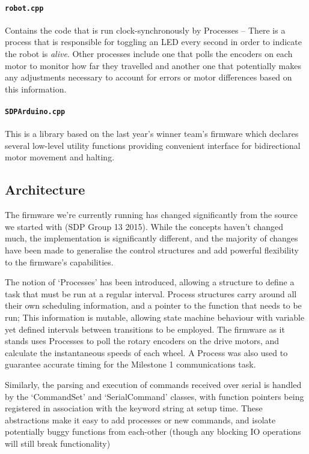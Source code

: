 \paragraph{\texttt{robot.cpp}} Contains the code that is run clock-synchronously by Processes -- There is a process that is responsible for toggling an LED every second in order to indicate the robot is \textit{alive}. Other processes include one that polls the encoders on each motor to monitor how far they travelled and another one that potentially makes any adjustments necessary to account for errors or motor differences based on this information.

\paragraph{\texttt{SDPArduino.cpp}} This is a library based on the last year's winner team's firmware which declares several low-level utility functions providing convenient interface for bidirectional motor movement and halting.

\subsection{Architecture}

The firmware we're currently running has changed significantly from the source we started with (SDP Group 13 2015). While the concepts haven't changed much, the implementation is significantly different, and the majority of changes have been made to generalise the control structures and add powerful flexibility to the firmware's capabilities.

The notion of `Processes' has been introduced, allowing a structure to define a task that must be run at a regular interval. Process structures carry around all their own scheduling information, and a pointer to the function that needs to be run; This information is mutable, allowing state machine behaviour with variable yet defined intervals between transitions to be employed. The firmware as it stands uses Processes to poll the rotary encoders on the drive motors, and calculate the instantaneous speeds of each wheel. A Process was also used to guarantee accurate timing for the Milestone 1 communications task.

Similarly, the parsing and execution of commands received over serial is handled by the `CommandSet' and `SerialCommand' classes, with function pointers being registered in association with the keyword string at setup time. These abstractions make it easy to add processes or new commands, and isolate potentially buggy functions from each-other (though any blocking IO operations will still break functionality)

